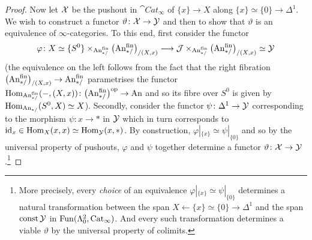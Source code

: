 \begin{proof}
	Now let $\mathcal{X}$ be the pushout in $\cat{Cat}_\infty$ of $\{x\}\rightarrow X$ along $\{x\}\simeq \{0\}\rightarrow \Delta^1$. We wish to construct a functor $\vartheta\colon \mathcal{X}\rightarrow \mathcal{Y}$ and then to show that $\vartheta$ is an equivalence of $\infty$-categories. To this end, first consider the functor
	\begin{equation*}
		\varphi\colon X\simeq \{S^0\}\times_{\FinAn}\bigl(\FinAn\bigr)_{/(X,x)}\longrightarrow \Jj\times_{\FinAn}\bigl(\FinAn\bigr)_{/(X,x)}\simeq \Yy
	\end{equation*}
	(the equivalence on the left follows from the fact that the right fibration $\bigl(\FinAn\bigr)\vphantom{)}^\mathrm{\phantom{fin}}_{/(X,x)}\rightarrow \FinAn$ parametrises the functor $\Hom_{\FinAn}(-,(X,x))\colon \bigl(\FinAn\bigr)^{\smash{\op}}\rightarrow \cat{An}$ and so its fibre over $S^0$ is given by $\operatorname{Hom}_{\mathrm{An}_{*/}}(S^0,X)\simeq X$). Secondly, consider the functor $\psi\colon \Delta^1\rightarrow \mathcal{Y}$ corresponding to the morphism $\psi\colon x\rightarrow *$ in $\mathcal{Y}$ which in turn corresponds to $\operatorname{id}_x\in \operatorname{Hom}_X(x,x)\simeq \operatorname{Hom}_{\mathcal{Y}}(x,*)$. By construction, $\varphi|_{\{x\}}\simeq \psi|_{\{0\}}$ and so by the universal property of pushouts, $\varphi$ and $\psi$ together determine a functor $\vartheta\colon \mathcal{X}\rightarrow \mathcal{Y}$.\footnote{More precisely, every \emph{choice} of an equivalence $\varphi|_{\{x\}}\simeq \psi|_{\{0\}}$ determines a natural transformation between the span $X \leftarrow \{x\}\simeq \{0\}\rightarrow \Delta^1$ and the span $\operatorname{const} \mathcal{Y}$ in $\operatorname{Fun}(\Lambda_0^2,\mathrm{Cat}_\infty)$. And every such transformation determines a viable $\vartheta$ by the universal property of colimits.}
	

\end{proof}
